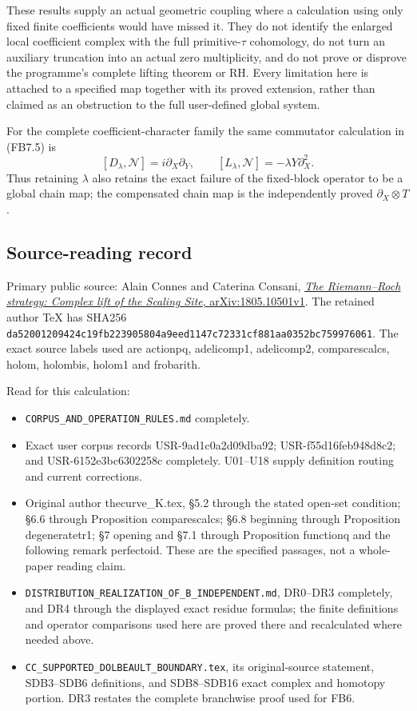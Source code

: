 These results supply an actual geometric coupling where a calculation
using only fixed finite coefficients would have missed it. They do not
identify the enlarged local coefficient complex with the full
primitive-\(\tau\) cohomology, do not turn an auxiliary truncation into
an actual zero multiplicity, and do not prove or disprove the
programme's complete lifting theorem or RH. Every limitation here is
attached to a specified map together with its proved extension, rather
than claimed as an obstruction to the full user-defined global system.

For the complete coefficient-character family the same commutator
calculation in (FB7.5) is \[
[D_\lambda,\mathscr N]=i\partial_X\partial_Y,\qquad
[L_\lambda,\mathscr N]=-\lambda Y\partial_X^2.
\tag{FB9.1}
\] Thus retaining \(\lambda\) also retains the exact failure of the
fixed-block operator to be a global chain map; the compensated chain map
is the independently proved \(\partial_X\otimes T\).

\subsection{Source-reading record}\label{source-reading-record}

Primary public source: Alain Connes and Caterina Consani,
\href{https://arxiv.org/abs/1805.10501v1}{\emph{The Riemann--Roch
strategy: Complex lift of the Scaling Site}, arXiv:1805.10501v1}. The
retained author TeX has SHA256
\nolinkurl{da52001209424c19fb223905804a9eed1147c72331cf881aa0352bc759976061}.
The exact source labels used are actionpq, adelicomp1, adelicomp2,
comparescalcs, holom, holombis, holom1 and frobarith.

Read for this calculation:

\begin{itemize}
\tightlist
\item
  \nolinkurl{CORPUS_AND_OPERATION_RULES.md} completely.
\item
  Exact user corpus records USR-9ad1c0a2d09dba92; USR-f55d16feb948d8c2;
  and USR-6152e3bc6302258c completely. U01--U18 supply definition
  routing and current corrections.
\item
  Original author thecurve\_K.tex, §5.2 through the stated open-set
  condition; §6.6 through Proposition comparescalcs; §6.8 beginning
  through Proposition degeneratetr1; §7 opening and §7.1 through
  Proposition functionq and the following remark perfectoid. These are
  the specified passages, not a whole-paper reading claim.
\item
  \nolinkurl{DISTRIBUTION_REALIZATION_OF_B_INDEPENDENT.md}, DR0--DR3 completely,
  and DR4 through the displayed exact residue formulas; the finite
  definitions and operator comparisons used here are proved there and
  recalculated where needed above.
\item
  \nolinkurl{CC_SUPPORTED_DOLBEAULT_BOUNDARY.tex}, its original-source statement,
  SDB3--SDB6 definitions, and SDB8--SDB16 exact complex and homotopy
  portion. DR3 restates the complete branchwise proof used for FB6.
\end{itemize}

